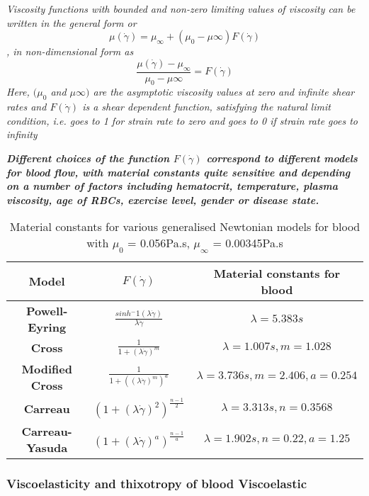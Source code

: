 \documentclass[11pt,letterpaper]{article}
\begin{document}
\textit{Viscosity functions with bounded and non-zero limiting values of viscosity can be written in the general
form or
 \begin{equation}
     \mu(\Dot{\gamma}) = \mu_{\infty} + (\mu_0 - \mu{\infty})F(\Dot{\gamma})
 \end{equation}
 , in non-dimensional form as
 \begin{equation}
     \frac{\mu(\Dot{\gamma})- \mu_{\infty} }{\mu_0 - \mu{\infty}}= F(\Dot{\gamma})
 \end{equation}
Here, $(\mu_0$ and $\mu{\infty})$ are the asymptotic viscosity values at zero and infinite shear rates and $F(\Dot{\gamma})$ is a shear dependent function, satisfying the natural limit condition, i.e. goes to 1 for strain rate to zero and goes to 0 if strain rate goes to infinity}

{\color{red}\textit{\textbf{Different choices of the function $F(\Dot{\gamma})$  correspond to different models for blood flow, with material constants quite sensitive and depending on a number of factors including hematocrit, temperature, plasma viscosity, age of RBCs, exercise level, gender or disease state.}}}


\begin{table}[htbp]
\centering
\begin{tabular}{ccc}
\toprule
Model & $F(\Dot{\gamma})$  & Material constants for blood \\
\midrule
\textbf{Powell-Eyring} & $\frac{sinh{^-1}(\lambda\Dot{\gamma})}{\lambda\Dot{\gamma}}$ & $\lambda=5.383s$\\
\textbf{Cross}  & $\frac{1}{1+(\lambda\Dot{\gamma})^m}$ & $\lambda=1.007s, m = 1.028$\\
\textbf{Modified Cross}  & $\frac{1}{1+((\lambda\Dot{\gamma})^m)^a}$ & $\lambda=3.736s, m = 2.406, a =0.254$ \\
\textbf{Carreau}  &$(1+(\lambda\Dot{\gamma})^2)^{\frac{n-1}{2}}$ & $\lambda=3.313s, n= 0.3568$\\
\textbf{Carreau-Yasuda}  & $(1+(\lambda\Dot{\gamma})^a)^{\frac{n-1}{a}}$ & $\lambda=1.902s, n= 0.22, a=1.25$\\
\bottomrule
\end{tabular}
\caption[Tabelle]{Material constants for various generalised Newtonian models for blood with $\mu_0$ = 0.056Pa.s, $\mu_{\infty}$ = 0.00345Pa.s}
\label{tab:toll1}
\end{table}



\subsubsection*{Viscoelasticity and thixotropy of blood Viscoelastic}
\end{document}
